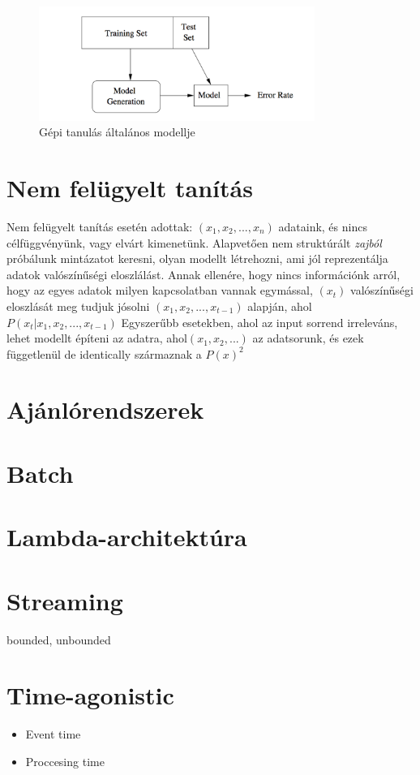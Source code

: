 \documentclass[a4paper,12pt]{article}
\begin{document}
\begin{figure}[ht!]
\centering
\includegraphics[width=90mm]{img/ml.png}
\caption{Gépi tanulás általános modellje \label{overflow}}
\end{figure}

\section{Nem felügyelt tanítás}
Nem felügyelt tanítás esetén adottak: $(x_1, x_2, ..., x_n)$ adataink, és nincs célfüggvényünk, vagy elvárt kimenetünk. Alapvetően nem struktúrált \textsl{zajból} próbálunk mintázatot keresni, olyan modellt létrehozni, ami jól reprezentálja adatok valószínűségi eloszlálást. Annak ellenére, hogy nincs információnk arról, hogy az egyes adatok milyen kapcsolatban vannak egymással, $(x_t)$ valószínűségi eloszlását meg tudjuk jósolni  $(x_1,x_2, ..., x_{t-1})$ alapján, ahol  $P(x_t|x_1,x_2, ..., x_{t-1})$
Egyszerűbb esetekben, ahol az input sorrend irreleváns, lehet modellt építeni az adatra, ahol$(x_1, x_2, ...)$ az adatsorunk, és ezek függetlenül de identically származnak a $P(x)^2$

\section{Ajánlórendszerek}

\section{Batch}
\section{Lambda-architektúra}
\section{Streaming}
bounded, unbounded
\section{Time-agonistic}
\begin{itemize}
\item Event time
\item Proccesing time
\end{itemize}
\end{document}
